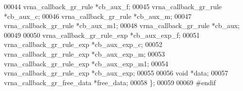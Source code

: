 \begin{DoxyCode}
00044   vrna\_callback\_gr\_rule       *cb\_aux\_f;
00045   vrna\_callback\_gr\_rule       *cb\_aux\_c;
00046   vrna\_callback\_gr\_rule       *cb\_aux\_m;
00047   vrna\_callback\_gr\_rule       *cb\_aux\_m1;
00048   vrna\_callback\_gr\_rule       *cb\_aux;
00049 
00050   vrna\_callback\_gr\_rule\_exp   *cb\_aux\_exp\_f;
00051   vrna\_callback\_gr\_rule\_exp   *cb\_aux\_exp\_c;
00052   vrna\_callback\_gr\_rule\_exp   *cb\_aux\_exp\_m;
00053   vrna\_callback\_gr\_rule\_exp   *cb\_aux\_exp\_m1;
00054   vrna\_callback\_gr\_rule\_exp   *cb\_aux\_exp;
00055 
00056   \textcolor{keywordtype}{void}                        *data;
00057   vrna\_callback\_gr\_free\_data  *free\_data;
00058 \};
00059 
00069 \textcolor{preprocessor}{#endif}
\end{DoxyCode}
